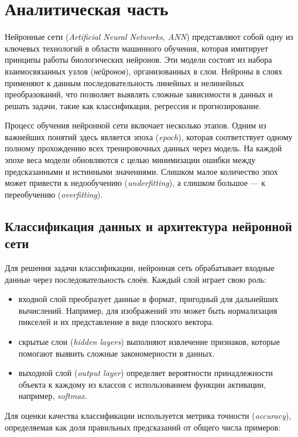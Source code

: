 \chapter{Аналитическая часть}

Нейронные сети (\textit{Artificial Neural Networks, ANN}) представляют собой одну из ключевых технологий в области машинного обучения, 
которая имитирует принципы работы биологических нейронов. 
Эти модели состоят из набора взаимосвязанных узлов (\textit{нейронов}), организованных в слои. 
Нейроны в слоях применяют к данным последовательность линейных и нелинейных преобразований, 
что позволяет выявлять сложные зависимости в данных и решать задачи, такие как классификация, регрессия и прогнозирование.

Процесс обучения нейронной сети включает несколько этапов. 
Одним из важнейших понятий здесь является эпоха (\textit{epoch}), 
которая соответствует одному полному прохождению всех тренировочных данных через модель. 
На каждой эпохе веса модели обновляются с целью минимизации ошибки между предсказанными и истинными значениями. 
Слишком малое количество эпох может привести к недообучению (\textit{underfitting}), а слишком большое — к переобучению (\textit{overfitting}).

\section{Классификация данных и архитектура нейронной сети}

Для решения задачи классификации, нейронная сеть обрабатывает входные данные через последовательность слоёв. 
Каждый слой играет свою роль:
\begin{itemize}
    \item входной слой преобразует данные в формат, пригодный для дальнейших вычислений. 
    Например, для изображений это может быть нормализация пикселей и их представление в виде плоского вектора.
    \item скрытые слои (\textit{hidden layers}) выполняют извлечение признаков, 
    которые помогают выявить сложные закономерности в данных.
    \item выходной слой (\textit{output layer}) определяет вероятности принадлежности объекта к каждому из классов 
    с использованием функции активации, например, \textit{softmax}.
\end{itemize}

Для оценки качества классификации используется метрика точности (\textit{accuracy}), 
определяемая как доля правильных предсказаний от общего числа примеров:


